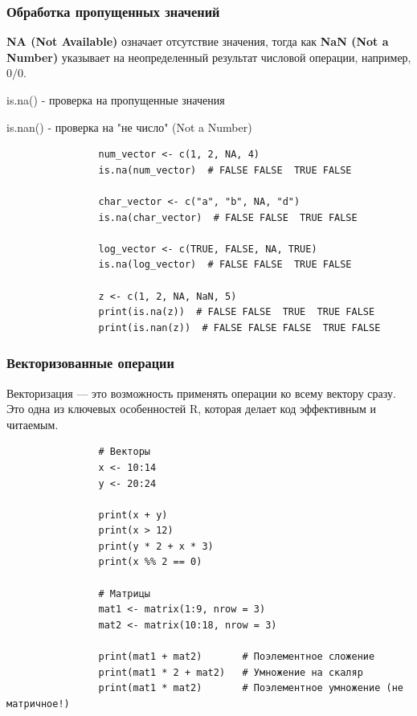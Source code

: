 \documentclass[11pt,a4paper]{beamer}
\begin{document}
	
	\begin{frame}[fragile]
		\frametitle{Обработка пропущенных значений}
		\textbf{NA (Not Available)} означает отсутствие значения, тогда как \textbf{NaN (Not a Number)} указывает на неопределенный результат числовой операции, например, \(0/0\).
		
		is.na() - проверка на пропущенные значения
		
		is.nan() - проверка на "не число" (Not a Number)
		{\fontsize{8}{8}\selectfont
			\begin{verbatim}
				num_vector <- c(1, 2, NA, 4)
				is.na(num_vector)  # FALSE FALSE  TRUE FALSE
				
				char_vector <- c("a", "b", NA, "d")
				is.na(char_vector)  # FALSE FALSE  TRUE FALSE
				
				log_vector <- c(TRUE, FALSE, NA, TRUE)
				is.na(log_vector)  # FALSE FALSE  TRUE FALSE
				
				z <- c(1, 2, NA, NaN, 5)
				print(is.na(z))  # FALSE FALSE  TRUE  TRUE FALSE
				print(is.nan(z))  # FALSE FALSE FALSE  TRUE FALSE
		\end{verbatim}	}
	\end{frame}
	
	
	
	
	\begin{frame}[fragile]
		\frametitle{Векторизованные операции}
		Векторизация — это возможность применять операции ко всему вектору сразу. Это одна из ключевых особенностей R, которая делает код эффективным и читаемым.
		{\fontsize{8}{9}\selectfont
			\begin{verbatim}
				# Векторы
				x <- 10:14
				y <- 20:24
				
				print(x + y)
				print(x > 12)
				print(y * 2 + x * 3)
				print(x %% 2 == 0)
				
				# Матрицы
				mat1 <- matrix(1:9, nrow = 3)
				mat2 <- matrix(10:18, nrow = 3)
				
				print(mat1 + mat2)       # Поэлементное сложение
				print(mat1 * 2 + mat2)   # Умножение на скаляр
				print(mat1 * mat2)       # Поэлементное умножение (не матричное!)   
			\end{verbatim}
		}
	\end{frame}
	
	
	
\end{document}
